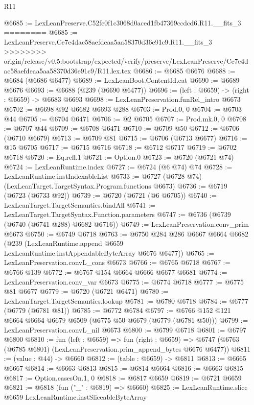 \begin{lexlean}{R11}
\begin{coremodule}
{{{{{{{{{{{{{{{{{{{{{{{{{{{{{{{{{{{{{{{{{{{{{{{{{{{{{{{{{{{{{{{{{{{{{{{{{{{{{{{{{{@6685 := LexLeanPreserve.C52fc0f1c3068d0aced1fb47369ccdcd6.R11.__fits_3
========
@6685 := LexLeanPreserve.Ce7e4dac58aefdeaa5aa58370d36e91c9.R11.__fits_3
>>>>>>>> origin/release/v0.5:bootstrap/expected/verify/preserve/LexLeanPreserve/Ce7e4dac58aefdeaa5aa58370d36e91c9/R11.lex.tex
@6686 := @6685 @6676
@6688 := @6684 (@6686 @6477)
@6689 := LexLeanBoot.ContentId.cat
@6690 := @6689 @6676
@6693 := @6688 (@239 (@6690 @6477))
@6696 := (left : @6659) -> (right : @6659) -> @6683 @6693
@6698 := LexLeanPreservation.funRel_intro @6673
@6702 := @6698 @92 @6682 @6693 @288
@6703 := Prod.{0, 0}
@6704 := @6703 @44
@6705 := @6704 @6471
@6706 := @2 @6705
@6707 := Prod.mk.{0, 0}
@6708 := @6707 @44
@6709 := @6708 @6471
@6710 := @6709 @50
@6712 := @6706 (@6710 @6679)
@6713 := @6709 @81
@6715 := @6706 (@6713 @6677)
@6716 := @15 @6705
@6717 := @6715 @6716
@6718 := @6712 @6717
@6719 := @6702 @6718
@6720 := Eq.refl.{1}
@6721 := Option.{0}
@6723 := @6720 (@6721 @74)
@6724 := LexLeanRuntime.index
@6727 := @6724 (@6 @74) @74
@6728 := LexLeanRuntime.instIndexableList
@6733 := @6727 (@6728 @74) (LexLeanTarget.TargetSyntax.Program.functions @6673)
@6736 := @6719 (@6723 (@6733 @92))
@6739 := @6720 (@6721 (@6 @6705))
@6740 := LexLeanTarget.TargetSemantics.bindAll
@6741 := LexLeanTarget.TargetSyntax.Function.parameters
@6747 := @6736 (@6739 (@6740 (@6741 @288) @6682 @6716))
@6749 := LexLeanPreservation.conv_prim @6673
@6750 := @6749 @6718
@6763 := @6750
    @284
    @286
    @6667
    @6664
    @6682
    (@239 (LexLeanRuntime.append @6659 LexLeanRuntime.instAppendableByteArray @6676 @6477))
@6765 := LexLeanPreservation.convL_cons @6673
@6766 := @6765 @6718
@6767 := @6766 @139
@6772 := @6767 @154 @6664 @6666 @6677 @6681
@6774 := LexLeanPreservation.conv_var @6673
@6775 := @6774 @6718
@6777 := @6775 @81 @6677
@6779 := @6720 (@6721 @6471)
@6780 := LexLeanTarget.TargetSemantics.lookup
@6781 := @6780 @6718
@6784 := @6777 (@6779 (@6781 @81))
@6785 := @6772 @6784
@6797 := @6766 @152 @121 @6664 @6664 @6679 @6509 (@6775 @50 @6679 (@6779 (@6781 @50)))
@6799 := LexLeanPreservation.convL_nil @6673
@6800 := @6799 @6718
@6801 := @6797 @6800
@6810 := fun (left : @6659) =>
  fun (right : @6659) =>
  @6747 (@6763 (@6785 @6801) (LexLeanPreservation.prim_append_bytes @6676 @6477))
@6811 := (value : @44) -> @6660
@6812 := (table : @6659) -> @6811
@6813 := @6665 @6667
@6814 := @6663 @6813
@6815 := @6814 @6664
@6816 := @6663 @6815
@6817 := Option.casesOn.{1, 0}
@6818 := @6817 @6659
@6819 := @6721 @6659
@6821 := @6818 (fun ("_" : @6819) => @6660)
@6825 := LexLeanRuntime.slice @6659 LexLeanRuntime.instSliceableByteArray
}}}}}}}}}}}}}}}}}}}}}}}}}}}}}}}}}}}}}}}}}}}}}}}}}}}}}}}}}}}}}}}}}}}}}}}}}}}}}}}}}}
\end{coremodule}
\end{lexlean}
